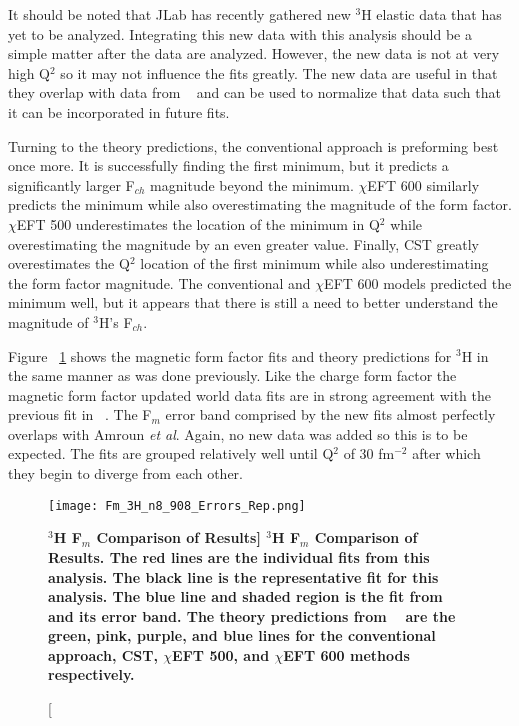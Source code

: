 It should be noted that JLab has recently gathered new $^3$H elastic data that has yet to be analyzed. Integrating this new data with this analysis should be a simple matter after the data are analyzed. However, the new data is not at very high Q$^2$ so it may not influence the fits greatly. The new data are useful in that they overlap with data from ~\cite{Article:Beck82} and can be used to normalize that data such that it can be incorporated in future fits.

Turning to the theory predictions, the conventional approach is preforming best once more. It is successfully finding the first minimum, but it predicts a significantly larger F$_{ch}$ magnitude beyond the minimum. $\chi$EFT 600 similarly predicts the minimum while also overestimating the magnitude of the form factor. $\chi$EFT 500 underestimates the location of the minimum in Q$^2$ while overestimating the magnitude by an even greater value. Finally, CST greatly overestimates the Q$^2$ location of the first minimum while also underestimating the form factor magnitude. The conventional and $\chi$EFT 600 models predicted the minimum well, but it appears that there is still a need to better understand the magnitude of $^3$H's F$_{ch}$.

Figure ~\ref{fig:3h_fm_theory} shows the magnetic form factor fits and theory predictions for $^3$H in the same manner as was done previously. Like the charge form factor the magnetic form factor updated world data fits are in strong agreement with the previous fit in ~\cite{Article:Amroun}. The F$_m$ error band comprised by the new fits almost perfectly overlaps with Amroun \textit{et al}. Again, no new data was added so this is to be expected. The fits are grouped relatively well until Q$^2$ of 30 fm$^{-2}$ after which they begin to diverge from each other. 

\begin{figure}[!ht]
	\begin{center}
	\texttt{[image: Fm\_3H\_n8\_908\_Errors\_Rep.png]}
	\end{center}
	\caption[\bf{$^3$H F$_{m}$ Comparison of Results}]{
	{\bf{$^3$H F$_{m}$ Comparison of Results.}} The red lines are the individual fits from this analysis. The black line is the representative fit for this analysis. The blue line and shaded region is the fit from ~\cite{Article:Amroun} and its error band. The theory predictions from ~\cite{Article:Marcucci} are the green, pink, purple, and blue lines for the conventional approach, CST, $\chi$EFT 500, and $\chi$EFT 600 methods respectively.}
	\label{fig:3h_fm_theory}
\end{figure}

